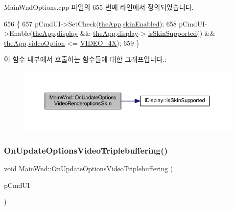 Main\+Wnd\+Options.\+cpp 파일의 655 번째 라인에서 정의되었습니다.


\begin{DoxyCode}
656 \{
657   pCmdUI->SetCheck(\mbox{\hyperlink{_v_b_a_8cpp_a8095a9d06b37a7efe3723f3218ad8fb3}{theApp}}.\mbox{\hyperlink{class_v_b_a_a5cc7dbf58210b127d9e807e8a3262829}{skinEnabled}});
658   pCmdUI->Enable(\mbox{\hyperlink{_v_b_a_8cpp_a8095a9d06b37a7efe3723f3218ad8fb3}{theApp}}.\mbox{\hyperlink{class_v_b_a_a940e5bad8b3ed2436888dbcd03bfd563}{display}} && \mbox{\hyperlink{_v_b_a_8cpp_a8095a9d06b37a7efe3723f3218ad8fb3}{theApp}}.\mbox{\hyperlink{class_v_b_a_a940e5bad8b3ed2436888dbcd03bfd563}{display}}->
      \mbox{\hyperlink{class_i_display_ad717007b624f0a8e7c830ab803cd8a92}{isSkinSupported}}() && \mbox{\hyperlink{_v_b_a_8cpp_a8095a9d06b37a7efe3723f3218ad8fb3}{theApp}}.\mbox{\hyperlink{class_v_b_a_a17dac073149c897f770c00ed7098ad32}{videoOption}} <= 
      \mbox{\hyperlink{_v_b_a_8h_a531c35e38ede3ea4e5ba5afb24b29493a6468bce6b84e6350d3de126f257eb38d}{VIDEO\_4X}});
659 \}
\end{DoxyCode}
이 함수 내부에서 호출하는 함수들에 대한 그래프입니다.\+:
\nopagebreak
\begin{figure}[H]
\begin{center}
\leavevmode
\includegraphics[width=350pt]{class_main_wnd_a2ad43f4ad55a02c28d1c288c4b5afe7c_cgraph}
\end{center}
\end{figure}
\mbox{\label{class_main_wnd_afe2f2080e99e36884b1cc80dcc996520}} 
\subsubsection{\texorpdfstring{On\+Update\+Options\+Video\+Triplebuffering()}{OnUpdateOptionsVideoTriplebuffering()}}
{\footnotesize\ttfamily void Main\+Wnd\+::\+On\+Update\+Options\+Video\+Triplebuffering (\begin{DoxyParamCaption}\item[{C\+Cmd\+UI $\ast$}]{p\+Cmd\+UI }\end{DoxyParamCaption})\hspace{0.3cm}{\ttfamily [protected]}}



